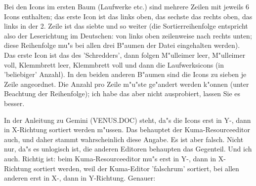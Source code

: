 Bei den Icons im ersten Baum (Laufwerke etc.)
sind mehrere Zeilen mit jeweils 6 Icons enthalten; das erste
Icon ist das links oben, das sechste das rechts oben, das links
in der 2. Zeile ist das siebte und so weiter (die 
Sortierreihenfolge entspricht also der Leserichtung im Deutschen:
von links oben zeilenweise nach rechts unten; diese Reihenfolge
mu"s bei allen drei B"aumen der Datei eingehalten werden). Das erste
Icon ist das des 'Schredders', dann folgen M"ulleimer leer, M"ulleimer
voll, Klemmbrett leer, Klemmbrett voll und dann die Laufwerksicons
(in 'beliebiger' Anzahl). In den beiden anderen B"aumen sind die
Icons zu sieben je Zeile angeordnet. Die Anzahl pro Zeile m"u"ste 
ge"andert werden k"onnen (unter Beachtung der Reihenfolge); ich habe
das aber nicht ausprobiert, lassen Sie es besser.

In der Anleitung zu Gemini (VENUS.DOC) steht, da"s die Icons
erst in Y-, dann in X-Richtung sortiert werden m"ussen. Das 
behauptet der Kuma-Resourceeditor auch, und daher stammt 
wahrscheinlich diese Angabe. Es ist aber falsch. Nicht nur,
da"s es unlogisch ist, die anderen Editoren behaupten das 
Gegenteil. Und ich auch. Richtig ist: beim Kuma-Resourceeditor mu"s
erst in Y-, dann in X-Richtung sortiert werden, weil der
Kuma-Editor 'falschrum' sortiert, bei allen anderen erst in
X-, dann in Y-Richtung. Genauer:

